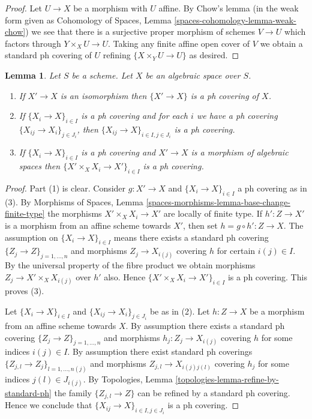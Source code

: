 \documentclass{stacks-project}
\theoremstyle{plain}
\newtheorem{lemma}[subsection]{Lemma}
\theoremstyle{definition}
\theoremstyle{remark}
\numberwithin{equation}{subsection}
\begin{document}
\begin{proof}
Let $U \to X$ be a morphism with $U$ affine.
By Chow's lemma (in the weak form given as
Cohomology of Spaces, Lemma \ref{spaces-cohomology-lemma-weak-chow})
we see that there is a surjective proper morphism of schemes
$V \to U$ which factors through $Y \times_X U \to U$.
Taking any finite affine open cover of $V$ we obtain a
standard ph covering of $U$ refining $\{X \times_Y U \to U\}$
as desired.
\end{proof}

\begin{lemma}
\label{lemma-ph}
Let $S$ be a scheme. Let $X$ be an algebraic space over $S$.
\begin{enumerate}
\item If $X' \to X$ is an isomorphism then $\{X' \to X\}$
is a ph covering of $X$.
\item If $\{X_i \to X\}_{i\in I}$ is a ph covering and for each
$i$ we have a ph covering $\{X_{ij} \to X_i\}_{j\in J_i}$, then
$\{X_{ij} \to X\}_{i \in I, j\in J_i}$ is a ph covering.
\item If $\{X_i \to X\}_{i\in I}$ is a ph covering
and $X' \to X$ is a morphism of algebraic spaces then
$\{X' \times_X X_i \to X'\}_{i\in I}$ is a ph covering.
\end{enumerate}
\end{lemma}

\begin{proof}
Part (1) is clear. Consider $g : X' \to X$ and
$\{X_i \to X\}_{i\in I}$ a ph covering as in (3). By
Morphisms of Spaces, Lemma \ref{spaces-morphisms-lemma-base-change-finite-type}
the morphisms $X' \times_X X_i \to X'$ are locally of finite type.
If $h' : Z \to X'$ is a morphism from an affine scheme
towards $X'$, then set $h = g \circ h' : Z \to X$. The assumption
on $\{X_i \to X\}_{i\in I}$ means there exists a standard ph covering
$\{Z_j \to Z\}_{j = 1, \ldots, n}$ and morphisms $Z_j \to X_{i(j)}$ covering
$h$ for certain $i(j) \in I$. By the universal property of the fibre product
we obtain morphisms $Z_j \to X' \times_X X_{i(j)}$ over $h'$ also.
Hence $\{X' \times_X X_i \to X'\}_{i\in I}$ is a ph covering.
This proves (3).

\medskip\noindent
Let $\{X_i \to X\}_{i\in I}$ and $\{X_{ij} \to X_i\}_{j\in J_i}$ be as
in (2). Let $h : Z \to X$ be a morphism from an affine scheme towards $X$.
By assumption there exists a standard ph covering
$\{Z_j \to Z\}_{j = 1, \ldots, n}$ and morphisms $h_j : Z_j \to X_{i(j)}$
covering $h$ for some indices $i(j) \in I$. By assumption there exist
standard ph coverings
$\{Z_{j, l} \to Z_j\}_{l = 1, \ldots, n(j)}$
and morphisms $Z_{j, l} \to X_{i(j)j(l)}$ covering
$h_j$ for some indices $j(l) \in J_{i(j)}$. By
Topologies, Lemma \ref{topologies-lemma-refine-by-standard-ph}
the family $\{Z_{j, l} \to Z\}$ can be refined by a standard ph covering.
Hence we conclude that $\{X_{ij} \to X\}_{i \in I, j\in J_i}$
is a ph covering.
\end{proof}
\end{document}
